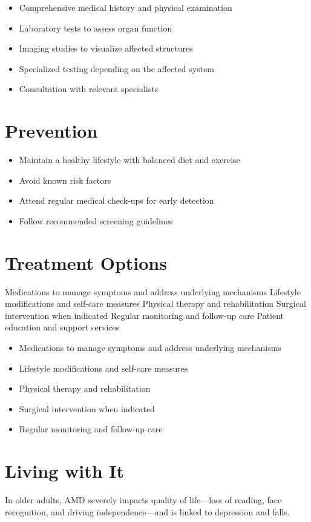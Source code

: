 \begin{itemize}[noitemsep]
  \item Comprehensive medical history and physical examination
  \item Laboratory tests to assess organ function
  \item Imaging studies to visualize affected structures
  \item Specialized testing depending on the affected system
  \item Consultation with relevant specialists
\end{itemize}
\section{Prevention}
\begin{itemize}[noitemsep]
  \item Maintain a healthy lifestyle with balanced diet and exercise
  \item Avoid known risk factors
  \item Attend regular medical check-ups for early detection
  \item Follow recommended screening guidelines
\end{itemize}
\section{Treatment Options}
Medications to manage symptoms and address underlying mechanisms Lifestyle modifications and self-care measures Physical therapy and rehabilitation Surgical intervention when indicated Regular monitoring and follow-up care Patient education and support services

\begin{itemize}[noitemsep]
  \item Medications to manage symptoms and address underlying mechanisms
  \item Lifestyle modifications and self-care measures
  \item Physical therapy and rehabilitation
  \item Surgical intervention when indicated
  \item Regular monitoring and follow-up care
\end{itemize}
\section{Living with It}
In older adults, AMD severely impacts quality of life---loss of reading, face recognition, and driving independence---and is linked to depression and falls.

